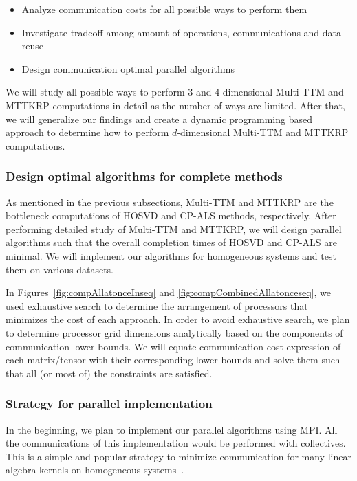 \documentclass[a4paper,11pt]{article}
\begin{document}
	
	\begin{itemize}
		\item Analyze communication costs for all possible ways to perform them 
		\item Investigate tradeoff among amount of operations, communications and data reuse
		\item Design communication optimal parallel algorithms
	\end{itemize}
	
	
	We will study all possible ways to perform $3$ and $4$-dimensional Multi-TTM and MTTKRP computations in detail as the number of ways are limited. After that, we will generalize our findings and create a dynamic programming based approach to determine how to perform $d$-dimensional Multi-TTM and MTTKRP computations.
	
	\subsubsection*{Design optimal algorithms for complete methods}

	As mentioned in the previous subsections, Multi-TTM and MTTKRP are  the bottleneck computations of HOSVD and CP-ALS methods, respectively. After performing detailed study of Multi-TTM and MTTKRP, we will design parallel algorithms such that the overall completion times of HOSVD and CP-ALS are minimal. We will implement our algorithms for homogeneous systems and test them on various datasets. 
	
	In Figures~\ref{fig:compAllatonceInseq} and \ref{fig:compCombinedAllatonceseq}, we used exhaustive search to determine the arrangement of processors that minimizes the cost of each approach. In order to avoid exhaustive search, we plan to determine processor grid dimensions analytically based on the components of communication lower bounds. We will equate communication cost expression of each matrix/tensor with their corresponding lower bounds and solve them such that all (or most of) the constraints are satisfied.
	

	
	
	\subsubsection*{Strategy for parallel implementation}
	In the beginning, we plan to implement our parallel algorithms using MPI. All the communications of this implementation would be performed with collectives. This is a simple and popular strategy to minimize communication for many linear algebra kernels on homogeneous systems~\cite{ABK-IPDPS-2016,BKK-TOMS-2020}.
	
\end{document}
